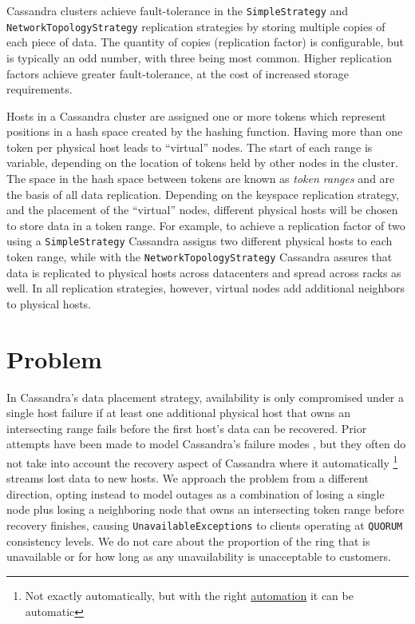 \documentclass{article}
\begin{document}
Cassandra clusters achieve fault-tolerance in the \texttt{SimpleStrategy}
and \\
\texttt{NetworkTopologyStrategy} replication strategies by storing multiple
copies of each piece of data. The quantity of copies (replication factor) is
configurable, but is typically an odd number, with three being most common.
Higher replication factors achieve greater fault-tolerance, at the cost of
increased storage requirements.

Hosts in a Cassandra cluster are assigned one or more tokens which represent
positions in a hash space created by the hashing function. Having more than
one token per physical host leads to ``virtual'' nodes. The start of each
range is variable, depending on the location of tokens held by other nodes
in the cluster. The space in the hash space between tokens are known as
\textit{token ranges} and are the basis of all data replication. Depending on
the keyspace replication strategy, and the placement of the ``virtual'' nodes,
different physical hosts will be chosen to store data in a token range.
For example, to achieve a replication factor of two using a
\texttt{SimpleStrategy} Cassandra assigns two different physical hosts to
each token range, while with the \texttt{NetworkTopologyStrategy} Cassandra
assures that data is replicated to physical hosts across datacenters and
spread across racks as well. In all replication strategies, however, virtual
nodes add additional neighbors to physical hosts.

\section{Problem}
\label{sec:problem}

In Cassandra's data placement strategy, availability is only compromised under
a single host failure if at least one additional physical host that owns an
intersecting range fails before the first host's data can be recovered. Prior
attempts have been made to model Cassandra's failure modes \cite{dataloss},
but they often do not take into account the recovery aspect of Cassandra where
it automatically \footnote{Not exactly automatically, but with the right
\href{https://github.com/Netflix/Priam}{automation} it can be automatic}
streams lost data to new hosts. We approach the problem from a different
direction, opting instead to model outages as a combination of losing a single
node plus losing a neighboring node that owns an intersecting token range
before recovery finishes, causing \texttt{UnavailableExceptions} to clients
operating at \texttt{QUORUM} consistency levels. We do not care about the
proportion of the ring that is unavailable or for how long as any
unavailability is unacceptable to customers.
\end{document}
